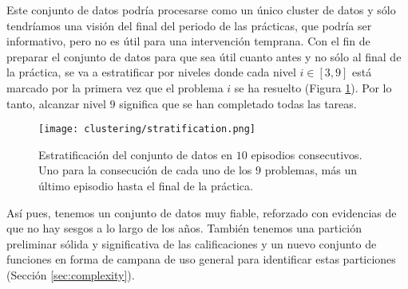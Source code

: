 Este conjunto de datos podría procesarse como un único cluster de datos y sólo tendríamos una visión del final del periodo de las prácticas, que podría ser informativo, pero no es útil para una intervención temprana. Con el fin de preparar el conjunto de datos para que sea útil cuanto antes y no sólo al final de la práctica, se va a estratificar por niveles donde cada nivel $i \in [3,9]$ está marcado por la primera vez que el problema $i$ se ha resuelto (Figura \ref{fig:stratification}). Por lo tanto, alcanzar nivel $9$ significa que se han completado todas las tareas.

\begin{figure}[H]
    \centering
    \texttt{[image: clustering/stratification.png]}
    \caption{Estratificación del conjunto de datos en $10$ episodios consecutivos. Uno para la consecución de cada uno de los $9$ problemas, más un último episodio hasta el final de la práctica.}
    \label{fig:stratification}
\end{figure}

Así pues, tenemos un conjunto de datos muy fiable, reforzado con evidencias de que no hay sesgos a lo largo de los años. También tenemos una partición preliminar sólida y significativa de las calificaciones y un nuevo conjunto de funciones en forma de campana de uso general para identificar estas particiones (Sección \ref{sec:complexity}).